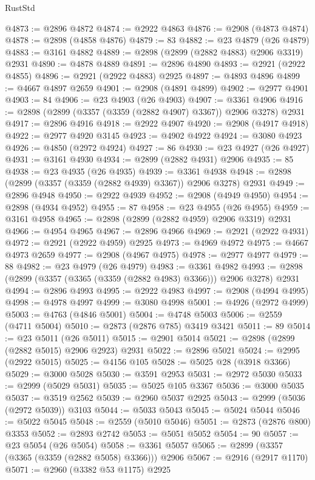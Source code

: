 \begin{lexlean}{RustStd}
\begin{coremodule}
@4873 := @2896 @4872
@4874 := @2922 @4863
@4876 := @2908 (@4873 @4874)
@4878 := @2898 (@4858 @4876)
@4879 := 83
@4882 := @23 @4879 (@26 @4879)
@4883 := @3161 @4882
@4889 := @2898 (@2899 (@2882 @4883) @2906 @3319) @2931
@4890 := @4878 @4889
@4891 := @2896 @4890
@4893 := @2921 (@2922 @4855)
@4896 := @2921 (@2922 @4883) @2925
@4897 := @4893 @4896
@4899 := @4667 @4897 @2659
@4901 := @2908 (@4891 @4899)
@4902 := @2977 @4901
@4903 := 84
@4906 := @23 @4903 (@26 @4903)
@4907 := @3361 @4906
@4916 := @2898 (@2899 (@3357 (@3359 (@2882 @4907) @3367)) @2906 @3278) @2931
@4917 := @2896 @4916
@4918 := @2922 @4907
@4920 := @2908 (@4917 @4918)
@4922 := @2977 @4920 @3145
@4923 := @4902 @4922
@4924 := @3080 @4923
@4926 := @4850 (@2972 @4924)
@4927 := 86
@4930 := @23 @4927 (@26 @4927)
@4931 := @3161 @4930
@4934 := @2899 (@2882 @4931) @2906
@4935 := 85
@4938 := @23 @4935 (@26 @4935)
@4939 := @3361 @4938
@4948 := @2898 (@2899 (@3357 (@3359 (@2882 @4939) @3367)) @2906 @3278) @2931
@4949 := @2896 @4948
@4950 := @2922 @4939
@4952 := @2908 (@4949 @4950)
@4954 := @2898 (@4934 @4952)
@4955 := 87
@4958 := @23 @4955 (@26 @4955)
@4959 := @3161 @4958
@4965 := @2898 (@2899 (@2882 @4959) @2906 @3319) @2931
@4966 := @4954 @4965
@4967 := @2896 @4966
@4969 := @2921 (@2922 @4931)
@4972 := @2921 (@2922 @4959) @2925
@4973 := @4969 @4972
@4975 := @4667 @4973 @2659
@4977 := @2908 (@4967 @4975)
@4978 := @2977 @4977
@4979 := 88
@4982 := @23 @4979 (@26 @4979)
@4983 := @3361 @4982
@4993 := @2898 (@2899 (@3357 (@3365 (@3359 (@2882 @4983) @3366))) @2906 @3278) @2931
@4994 := @2896 @4993
@4995 := @2922 @4983
@4997 := @2908 (@4994 @4995)
@4998 := @4978 @4997
@4999 := @3080 @4998
@5001 := @4926 (@2972 @4999)
@5003 := @4763 (@4846 @5001)
@5004 := @4748 @5003
@5006 := @2559 (@4711 @5004)
@5010 := @2873 (@2876 @785) @3419 @3421
@5011 := 89
@5014 := @23 @5011 (@26 @5011)
@5015 := @2901 @5014
@5021 := @2898 (@2899 (@2882 @5015) @2906 @2923) @2931
@5022 := @2896 @5021
@5024 := @2995 (@2922 @5015)
@5025 := @4156 @105
@5028 := @5025 @28 (@3918 @3366)
@5029 := @3000 @5028
@5030 := @3591 @2953
@5031 := @2972 @5030
@5033 := @2999 (@5029 @5031)
@5035 := @5025 @105 @3367
@5036 := @3000 @5035
@5037 := @3519 @2562
@5039 := @2960 @5037 @2925
@5043 := @2999 (@5036 (@2972 @5039)) @3103
@5044 := @5033 @5043
@5045 := @5024 @5044
@5046 := @5022 @5045
@5048 := @2559 (@5010 @5046)
@5051 := @2873 (@2876 @800) @3353
@5052 := @2893 @2742
@5053 := @5051 @5052
@5054 := 90
@5057 := @23 @5054 (@26 @5054)
@5058 := @3361 @5057
@5065 := @2899 (@3357 (@3365 (@3359 (@2882 @5058) @3366))) @2906
@5067 := @2916 (@2917 @1170)
@5071 := @2960 (@3382 @53 @1175) @2925

\end{coremodule}
\end{lexlean}
